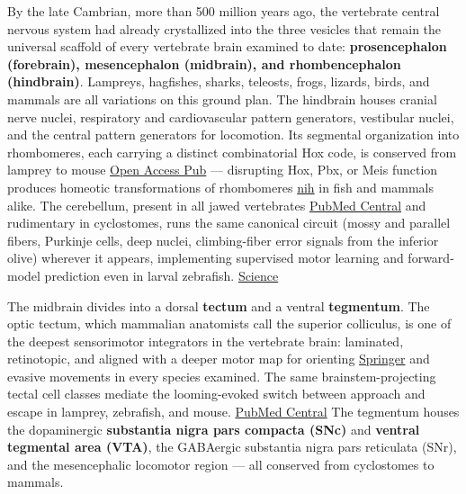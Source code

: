 By the late Cambrian, more than 500 million years ago, the vertebrate central nervous system had already crystallized into the three vesicles that remain the universal scaffold of every vertebrate brain examined to date: \textbf{prosencephalon (forebrain), mesencephalon (midbrain), and rhombencephalon (hindbrain)}. Lampreys, hagfishes, sharks, teleosts, frogs, lizards, birds, and mammals are all variations on this ground plan. The hindbrain houses cranial nerve nuclei, respiratory and cardiovascular pattern generators, vestibular nuclei, and the central pattern generators for locomotion. Its segmental organization into rhombomeres, each carrying a distinct combinatorial Hox code, is conserved from lamprey to mouse \href{https://openaccesspub.org/evolutionary-science/article/1641}{Open Access Pub} --- disrupting Hox, Pbx, or Meis function produces homeotic transformations of rhombomeres \href{https://www.ncbi.nlm.nih.gov/pmc/articles/PMC4489388/}{nih} in fish and mammals alike. The cerebellum, present in all jawed vertebrates \href{https://pmc.ncbi.nlm.nih.gov/articles/PMC3389513/}{PubMed Central} and rudimentary in cyclostomes, runs the same canonical circuit (mossy and parallel fibers, Purkinje cells, deep nuclei, climbing-fiber error signals from the inferior olive) wherever it appears, implementing supervised motor learning and forward-model prediction even in larval zebrafish. \href{https://www.science.org/doi/10.1126/sciadv.adi6470}{Science}

The midbrain divides into a dorsal \textbf{tectum} and a ventral \textbf{tegmentum}. The optic tectum, which mammalian anatomists call the superior colliculus, is one of the deepest sensorimotor integrators in the vertebrate brain: laminated, retinotopic, and aligned with a deeper motor map for orienting \href{https://link.springer.com/article/10.1007/s12264-022-00858-1}{Springer} and evasive movements in every species examined. The same brainstem-projecting tectal cell classes mediate the looming-evoked switch between approach and escape in lamprey, zebrafish, and mouse. \href{https://pmc.ncbi.nlm.nih.gov/articles/PMC6660747/}{PubMed Central} The tegmentum houses the dopaminergic \textbf{substantia nigra pars compacta (SNc)} and \textbf{ventral tegmental area (VTA)}, the GABAergic substantia nigra pars reticulata (SNr), and the mesencephalic locomotor region --- all conserved from cyclostomes to mammals.

